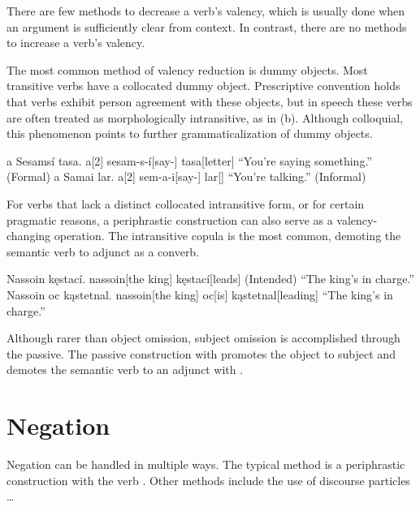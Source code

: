 There are few methods to decrease a verb's valency, which is usually done when an argument is sufficiently clear from context. In contrast, there are no methods to increase a verb's valency.

The most common method of valency reduction is dummy objects. Most transitive verbs have a collocated dummy object. Prescriptive convention holds that verbs exhibit person agreement with these objects, but in speech these verbs are often treated as morphologically intransitive, as in (\nextx b). Although colloquial, this phenomenon points to further grammaticalization of dummy objects.

\begin{gloss}
	\a \begingl
		\glpreamble a Sesamsí tasa. \endpreamble
			a[2]
			sesam-s-í[say-]
			tasa[letter]
		\glft “You're saying something.”
		\trailingcitation (Formal)
	\endgl
	\a \begingl
		\glpreamble a Samai lar. \endpreamble
			a[2]
			sem-a-i[say-]
			lar[]
		\glft “You're talking.”
		\trailingcitation (Informal)
	\endgl {}
\end{gloss}

For verbs that lack a distinct collocated intransitive form, or for certain pragmatic reasons, a periphrastic construction can also serve as a valency-changing operation. The intransitive copula  is the most common, demoting the semantic verb to adjunct as a converb.

\begin{gloss}
	\a \begingl
		\glpreamble *Nassoin kęstací. \endpreamble
			nassoin[the king]
			kęstací[leads]
		\glft (Intended) “The king's in charge.”
	\endgl
	\a \begingl
		\glpreamble Nassoin oc kąstetnal. \endpreamble
			nassoin[the king]
			oc[is]
			kąstetnal[leading]
		\glft “The king's in charge.”
	\endgl {}
\end{gloss}

Although rarer than object omission, subject omission is accomplished through the  passive. The passive construction with  promotes the object to subject and demotes the semantic verb to an adjunct with .

\section{Negation}
Negation can be handled in multiple ways. The typical method is a periphrastic construction with the verb . Other methods include the use of discourse particles \dots

